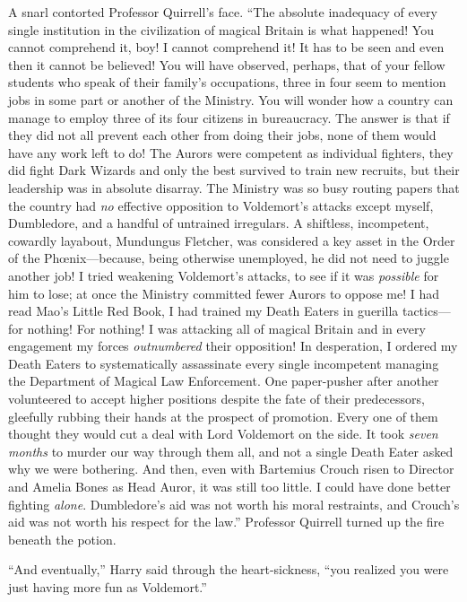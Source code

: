 A snarl contorted Professor Quirrell’s face. “The absolute inadequacy of every single institution in the civilization of magical Britain is what happened! You cannot comprehend it, boy! I cannot comprehend it! It has to be seen and even then it cannot be believed! You will have observed, perhaps, that of your fellow students who speak of their family’s occupations, three in four seem to mention jobs in some part or another of the Ministry. You will wonder how a country can manage to employ three of its four citizens in bureaucracy. The answer is that if they did not all prevent each other from doing their jobs, none of them would have any work left to do! The Aurors were competent as individual fighters, they did fight Dark Wizards and only the best survived to train new recruits, but their leadership was in absolute disarray. The Ministry was so busy routing papers that the country had \emph{no} effective opposition to Voldemort’s attacks except myself, Dumbledore, and a handful of untrained irregulars. A shiftless, incompetent, cowardly layabout, Mundungus Fletcher, was considered a key asset in the Order of the Phœnix—because, being otherwise unemployed, he did not need to juggle another job! I tried weakening Voldemort’s attacks, to see if it was \emph{possible} for him to lose; at once the Ministry committed fewer Aurors to oppose me! I had read Mao’s Little Red Book, I had trained my Death Eaters in guerilla tactics—for nothing! For nothing! I was attacking all of magical Britain and in every engagement my forces \emph{outnumbered} their opposition! In desperation, I ordered my Death Eaters to systematically assassinate every single incompetent managing the Department of Magical Law Enforcement. One paper-pusher after another volunteered to accept higher positions despite the fate of their predecessors, gleefully rubbing their hands at the prospect of promotion. Every one of them thought they would cut a deal with Lord Voldemort on the side. It took \emph{seven months} to murder our way through them all, and not a single Death Eater asked why we were bothering. And then, even with Bartemius Crouch risen to Director and Amelia Bones as Head Auror, it was still too little. I could have done better fighting \emph{alone}. Dumbledore’s aid was not worth his moral restraints, and Crouch’s aid was not worth his respect for the law.” Professor Quirrell turned up the fire beneath the potion.

“And eventually,” Harry said through the heart-sickness, “you realized you were just having more fun as Voldemort.”

